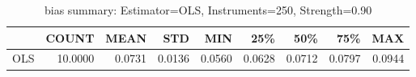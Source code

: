 \begin{table}[ht]
\centering
\caption{bias summary: Estimator=OLS, Instruments=250, Strength=0.90}
\begin{tabular}{lrrrrrrrr}
\toprule
 & COUNT & MEAN & STD & MIN & 25\% & 50\% & 75\% & MAX \\
\midrule
OLS & 10.0000 & 0.0731 & 0.0136 & 0.0560 & 0.0628 & 0.0712 & 0.0797 & 0.0944 \\
\bottomrule
\end{tabular}
\end{table}
